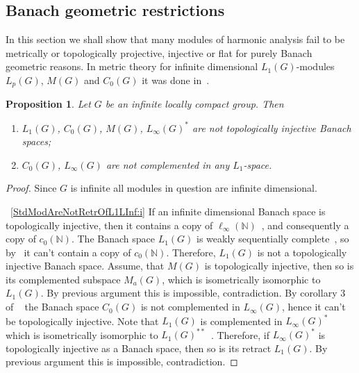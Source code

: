 \documentclass{article}
\theoremstyle{plain}
\newtheorem{proposition}{Proposition}[section]
\theoremstyle{definition}
\newtheorem{proof}{Proof}\def\theproof{}
\begin{document}
\begin{fulltext}

\section{Banach geometric restrictions}\label{
    SubSectionBanachGeometricRestriction
}

In this section we shall show that many modules of harmonic analysis fail to be
metrically or topologically projective, injective or flat for purely Banach
geometric reasons. In metric theory for infinite dimensional $L_1(G)$-modules
$L_p(G)$, $M(G)$ and $C_0(G)$ it was done in~\cite[theorems
4.12--4.14]{GravInjProjBanMod}.

\begin{proposition}\label{StdModAreNotRetrOfL1LInf} Let $G$ be an infinite
locally compact group. Then
\begin{enumerate}[label = (\roman*)]
    \item $L_1(G)$, $C_0(G)$, $M(G)$, ${L_\infty(G)}^*$ are not topologically
    injective Banach spaces;\label{StdModAreNotRetrOfL1LInf:i}
    
    \item $C_0(G)$, $L_\infty(G)$ are not complemented in any 
    $L_1$-space.\label{StdModAreNotRetrOfL1LInf:ii}
\end{enumerate}
\end{proposition}
\begin{proof}
Since $G$ is infinite all modules in question are infinite dimensional.

~\ref{StdModAreNotRetrOfL1LInf:i} If an infinite dimensional Banach space is
topologically injective, then it contains a copy of
$\ell_\infty(\mathbb{N})$~\cite[corollary 1.1.4]{RosOnRelDisjFamOfMeas}, and
consequently a copy of $c_0(\mathbb{N})$. The Banach space $L_1(G)$ is weakly
sequentially complete~\cite[corollary III.C.14]{WojBanSpForAnalysts}, so
by~\cite[corollary 5.2.11]{KalAlbTopicsBanSpTh} it can't contain a copy of
$c_0(\mathbb{N})$. Therefore, $L_1(G)$ is not a topologically injective Banach
space. Assume, that $M(G)$ is topologically injective, then so is its
complemented subspace $M_a(G)$, which is isometrically isomorphic to $L_1(G)$.
By previous argument this is impossible, contradiction. By corollary 3 of
~\cite{LauMingComplSubspInLInfOfG} the Banach space $C_0(G)$ is not complemented
in $L_\infty(G)$, hence it can't be topologically injective. Note that $L_1(G)$
is complemented in ${L_\infty(G)}^*$ which is isometrically isomorphic to
${L_1(G)}^{**}$~\cite[proposition  B10]{DefFloTensNorOpId}. Therefore, if
${L_\infty(G)}^*$ is topologically injective as a Banach space, then so is its
retract $L_1(G)$. By previous argument this is impossible, contradiction.


\end{proof}
\end{fulltext}
\end{document}

